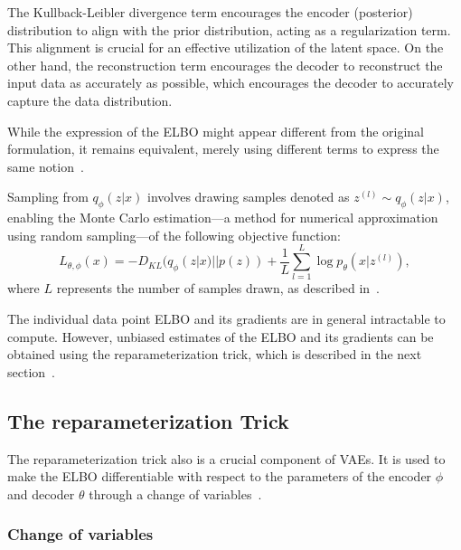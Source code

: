 The Kullback-Leibler divergence term encourages the encoder (posterior) distribution to align with the prior distribution, acting as a regularization term. This alignment is crucial for an effective utilization of the latent space. On the other hand, the reconstruction term encourages the decoder to reconstruct the input data as accurately as possible, which encourages the decoder to accurately capture the data distribution.

While the expression of the ELBO might appear different from the original formulation, it remains equivalent, merely using different terms to express the same notion~\cite{Kingma_2019}.

Sampling from $q_{\phi}(z|x)$ involves drawing samples denoted as $z^{(l)} \sim q_{\phi}(z|x)$, enabling the Monte Carlo estimation—a method for numerical approximation using random sampling—of the following objective function:
\[ L_{\theta, \phi}(x) = - D_{KL}(q_{\phi}(z|x) || p(z)) + \frac{1}{L} \sum_{l=1}^{L} \log p_{\theta}(x|z^{(l)}) ,\]
where $L$ represents the number of samples drawn, as described in~\cite{Kingma_2019}.


The individual data point ELBO and its gradients are in general intractable to compute. However, unbiased estimates of the ELBO and its gradients can be obtained using the reparameterization trick, which is described in the next section~\cite{Kingma_2019}.

\subsection{The reparameterization Trick}

The reparameterization trick also is a crucial component of VAEs. It is used to make the ELBO differentiable with respect to the parameters of the encoder $\phi$ and decoder $\theta$ through a change of variables~\cite{Kingma_2019}.

\subsubsection{Change of variables}

